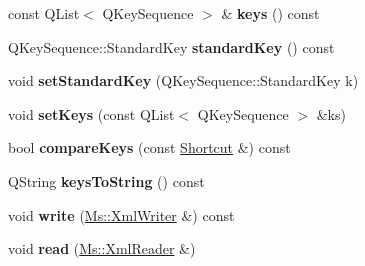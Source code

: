 \begin{DoxyCompactItemize}
\mbox{\label{class_ms_1_1_shortcut_a4ca071e9c55576930f2cd36f1c65cd82}} 
const Q\+List$<$ Q\+Key\+Sequence $>$ \& {\bfseries keys} () const
\item 
\mbox{\label{class_ms_1_1_shortcut_a534bb775947964152b2d0b3b675cce22}} 
Q\+Key\+Sequence\+::\+Standard\+Key {\bfseries standard\+Key} () const
\item 
\mbox{\label{class_ms_1_1_shortcut_ac243df9172eb2be2844b43303fa0f3d6}} 
void {\bfseries set\+Standard\+Key} (Q\+Key\+Sequence\+::\+Standard\+Key k)
\item 
\mbox{\label{class_ms_1_1_shortcut_a2d3d2955068eab4b547f7bed4881ebd0}} 
void {\bfseries set\+Keys} (const Q\+List$<$ Q\+Key\+Sequence $>$ \&ks)
\item 
\mbox{\label{class_ms_1_1_shortcut_a30638a55c17a7453660dd6b3bbeccc54}} 
bool {\bfseries compare\+Keys} (const \hyperlink{class_ms_1_1_shortcut}{Shortcut} \&) const
\item 
\mbox{\label{class_ms_1_1_shortcut_ac52be4106754635d4929564834b6099b}} 
Q\+String {\bfseries keys\+To\+String} () const
\item 
\mbox{\label{class_ms_1_1_shortcut_a9de9ecb525a8f0f2fc143071bbb53ff5}} 
void {\bfseries write} (\hyperlink{class_ms_1_1_xml_writer}{Ms\+::\+Xml\+Writer} \&) const
\item 
\mbox{\label{class_ms_1_1_shortcut_a8ab0d7bb98ce06e96127e3adb4fd43c9}} 
void {\bfseries read} (\hyperlink{class_ms_1_1_xml_reader}{Ms\+::\+Xml\+Reader} \&)
\end{DoxyCompactItemize}
